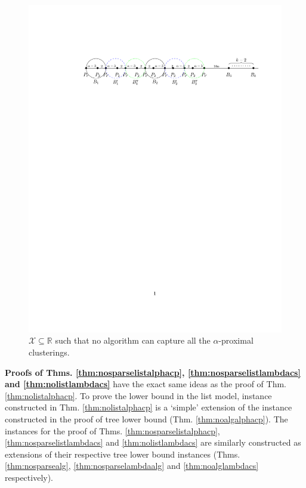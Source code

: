 \documentclass[orivec]{llncs}
\newcommand{\mc}{\mathcal}
\begin{document}
\begin{figure}[!t]
\vspace{-5mm}
\begin{center}
\includegraphics[trim={40mm 210mm 20mm 40mm},clip,width=\textwidth]{figures/lbdFig3}
\end{center}
\vspace{-4mm}
\caption{$\mc X \subseteq \mathbb{R}$ such that no algorithm can capture all the $\alpha$-proximal clusterings. } 
\label{fig:nosparsealg}
\end{figure}

\noindent\textbf{Proofs of Thms. \ref{thm:nosparselistalphacp}, \ref{thm:nosparselistlambdacs} and \ref{thm:nolistlambdacs}} have the exact same ideas as the proof of Thm. \ref{thm:nolistalphacp}. To prove the lower bound in the list model, instance constructed in Thm. \ref{thm:nolistalphacp} is a `simple' extension of the instance constructed in the proof of tree lower bound (Thm. \ref{thm:noalgalphacp}). The instances for the proof of Thms. \ref{thm:nosparselistalphacp}, \ref{thm:nosparselistlambdacs} and \ref{thm:nolistlambdacs} are similarly constructed as extensions of their respective tree lower bound instances (Thms. \ref{thm:nosparsealg}, \ref{thm:nosparselambdaalg} and \ref{thm:noalglambdacs} respectively).\\
\end{document}
